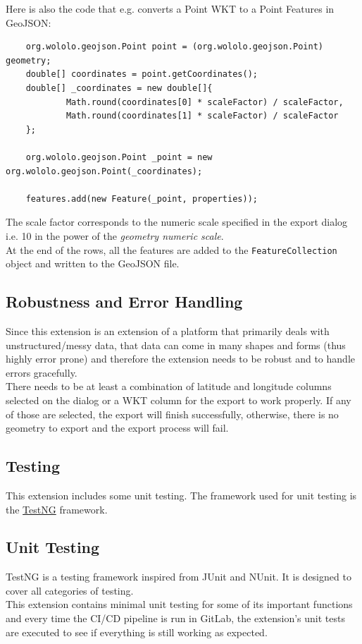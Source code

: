 Here is also the code that e.g. converts a Point WKT to a Point Features in GeoJSON:
\begin{verbatim}
    org.wololo.geojson.Point point = (org.wololo.geojson.Point) geometry;
    double[] coordinates = point.getCoordinates();
    double[] _coordinates = new double[]{
            Math.round(coordinates[0] * scaleFactor) / scaleFactor,
            Math.round(coordinates[1] * scaleFactor) / scaleFactor
    };

    org.wololo.geojson.Point _point = new org.wololo.geojson.Point(_coordinates);

    features.add(new Feature(_point, properties));
\end{verbatim}
The scale factor corresponds to the numeric scale specified in the export dialog i.e. 10 in the power of the \textit{geometry numeric scale}.\\
\newline
At the end of the rows, all the features are added to the \texttt{FeatureCollection} object and written to the GeoJSON file.
\subsection{Robustness and Error Handling}
Since this extension is an extension of a platform that primarily deals with unstructured/messy data, that data can come in many shapes and forms (thus highly error prone) and therefore the extension needs to be robust and to handle errors gracefully.\\
\newline
There needs to be at least a combination of latitude and longitude columns selected on the dialog or a WKT column for the export to work properly. If any of those are selected, the export will finish successfully, otherwise, there is no geometry to export and the export process will fail.
\subsection{Testing}
This extension includes some unit testing. The framework used for unit testing is the \href{https://testng.org/}{TestNG} framework.
\subsection{Unit Testing}
TestNG is a testing framework inspired from JUnit and NUnit. It is designed to cover all categories of testing.\\
\newline
This extension contains minimal unit testing for some of its important functions and every time the CI/CD pipeline is run in GitLab, the
extension's unit tests are executed to see if everything is still working as expected.
\pagebreak
